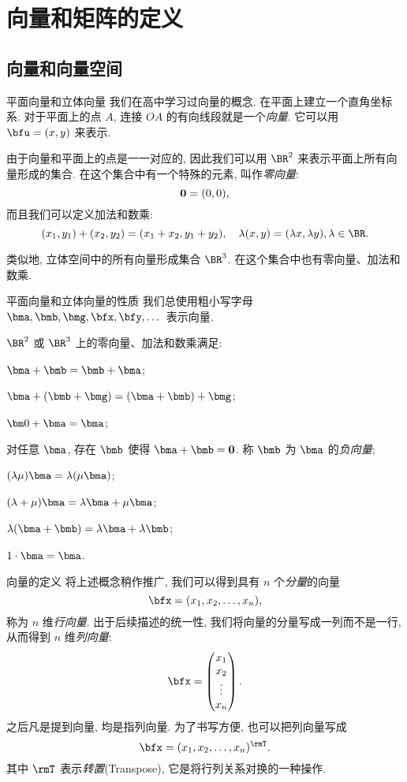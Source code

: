\section{向量和矩阵的定义}


\subsection{向量和向量空间}
\begin{frame}{平面向量和立体向量\noexer}
	\onslide<+->
	我们在高中学习过向量的概念.
	\onslide<+->
	在平面上建立一个直角坐标系. 对于平面上的点 $A$, 连接 $OA$ 的有向线段就是一个\emph{向量}.
	\onslide<+->
	它可以用 $\bfu=(x,y)$ 来表示.

	\onslide<+->
	由于向量和平面上的点是一一对应的, 因此我们可以用 $\BR^2$ 来表示平面上所有向量形成的集合.
	\onslide<+->
	在这个集合中有一个特殊的元素, 叫作\emph{零向量}:
	\[{\bf0}=(0,0),\]
	\onslide<+->
	而且我们可以定义加法和数乘:
	\[(x_1,y_1)+(x_2,y_2)=(x_1+x_2,y_1+y_2),\quad
	\lambda(x,y)=(\lambda x,\lambda y),\lambda\in\BR.\]

	\onslide<+->
	类似地, 立体空间中的所有向量形成集合 $\BR^3$.
	\onslide<+->
	在这个集合中也有零向量、加法和数乘.
\end{frame}


\begin{frame}{平面向量和立体向量的性质\noexer}
	\onslide<+->
	我们总使用粗小写字母 $\bma,\bmb,\bmg,\bfx,\bfy,\dots$ 表示向量.

	\onslide<+->
	$\BR^2$ 或 $\BR^3$ 上的零向量、加法和数乘满足:
	\begin{enumV}\bf
		\item $\bma+\bmb=\bmb+\bma$;
		\item $\bma+(\bmb+\bmg)=(\bma+\bmb)+\bmg$;
		\item ${\bm0}+\bma=\bma$;
		\item 对任意 $\bma$, 存在 $\bmb$ 使得 $\bma+\bmb={\bf0}$. 称 $\bmb$ 为 $\bma$ 的\emph{负向量};
		\item $(\lambda\mu)\bma=\lambda(\mu\bma)$;
		\item $(\lambda+\mu)\bma=\lambda\bma+\mu\bma$;
		\item $\lambda(\bma+\bmb)=\lambda\bma+\lambda\bmb$;
		\item $1\cdot\bma=\bma$.
	\end{enumV}
\end{frame}


\begin{frame}{向量的定义}
	\onslide<+->
	将上述概念稍作推广, 我们可以得到具有 $n$ 个\emph{分量}的向量
	\[\bfx=(x_1,x_2,\dots,x_n),\]
	称为 $n$ 维\emph{行向量}.
	\onslide<+->
	出于后续描述的统一性, 我们将向量的分量写成一列而不是一行, 从而得到 $n$ 维\emph{列向量}:
	\[\bfx=\begin{pmatrix}
		x_1\\
		x_2\\
		\vdots\\
		x_n
	\end{pmatrix}.\]
	\onslide<+->
	\alert{之后凡是提到向量, 均是指列向量}.
	\onslide<+->
	为了书写方便, 也可以把列向量写成
	\[\bfx=(x_1,x_2,\dots,x_n)^\rmT.\]
	其中 $\rmT$ 表示\emph{转置}(Transpose), 它是将行列关系对换的一种操作.
\end{frame}


